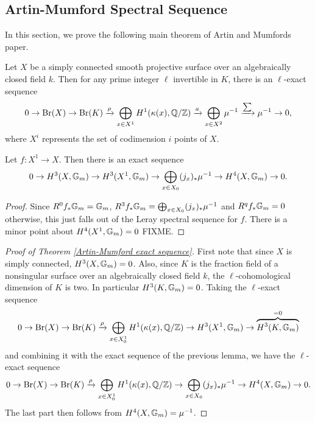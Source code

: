 \subsection{Artin-Mumford Spectral Sequence}
In this section, we prove the following main theorem of Artin and Mumfords paper.
\begin{thm}\label{Artin-Mumford exact sequence}
Let $X$ be a simply connected smooth projective surface over an algebraically closed field $k$.  Then for any prime integer $\ell$ invertible in $K$, there is an $\ell$-exact sequence
$$0\rightarrow\textnormal{Br}(X)\rightarrow\textnormal{Br}(K)\xrightarrow{\rho}\bigoplus_{x\in X^1} H^1(\kappa(x),\mathbb{Q}/\mathbb{Z})\xrightarrow{a}\bigoplus_{x\in X^2} \mu^{-1}\xrightarrow{\sum}\mu^{-1}\rightarrow 0,$$
where $X^i$ represents the set of codimension $i$ points of $X$.
\end{thm}

\begin{lem}
Let $f: X^1\rightarrow X$.  Then there is an exact sequence
$$0\rightarrow H^3(X,\mathbb{G}_m)\rightarrow H^3(X^1,\mathbb{G}_m)\rightarrow \bigoplus_{x\in X_0} (j_x)_*\mu^{-1}\rightarrow H^4(X,\mathbb{G}_m)\rightarrow 0.$$
\end{lem}
\begin{proof}
Since $R^0f_*\mathbb{G}_m = \mathbb{G}_m$, $R^3f_*\mathbb{G}_m = \bigoplus_{x\in X_0} (j_x)_*\mu^{-1}$ and $R^qf_*\mathbb{G}_m = 0$ otherwise, this just falls out of the Leray spectral sequence for $f$.  There is a minor point about $H^4(X^1,\mathbb{G}_m)=0$ FIXME.
\end{proof}

\begin{proof}[Proof of Theorem \ref{Artin-Mumford exact sequence}]
First note that since $X$ is simply connected, $H^3(X,\mathbb{G}_m) = 0$.  Also, since $K$ is the fraction field of a nonsingular surface over an algebraically closed field $k$, the $\ell$-cohomological dimension of $K$ is two.  In particular $H^3(K,\mathbb{G}_m) = 0$.  Taking the $\ell$-exact sequence
$$0\rightarrow \textnormal{Br}(X)\rightarrow\textnormal{Br}(K)\xrightarrow{\rho}\bigoplus_{x\in X^1_0} H^1(\kappa(x),\mathbb{Q}/\mathbb{Z})\rightarrow H^3(X^1,\mathbb{G}_m)\rightarrow  \overbrace{H^3(K,\mathbb{G}_m)}^{=0}$$
and combining it with the exact sequence of the previous lemma, we have the $\ell$-exact sequence
$$0\rightarrow \textnormal{Br}(X)\rightarrow\textnormal{Br}(K)\xrightarrow{\rho}\bigoplus_{x\in X^1_0} H^1(\kappa(x),\mathbb{Q}/\mathbb{Z})\rightarrow \bigoplus_{x\in X_0}(j_x)_*\mu^{-1}\rightarrow H^4(X,\mathbb{G}_m)\rightarrow 0.$$
The last part then follows from $H^4(X,\mathbb{G}_m) = \mu^{-1}$.
\end{proof}


